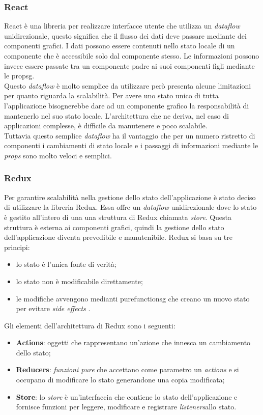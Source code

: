 \subsubsection*{React}
React è una libreria per realizzare interfacce utente che utilizza un \emph{dataflow} unidirezionale, questo significa che il flusso dei dati deve passare mediante dei componenti grafici. I dati possono essere contenuti nello stato locale di un componente che è accessibile solo dal componente stesso. Le informazioni possono invece essere passate tra un componente padre ai suoi componenti figli mediante le \gls{propsg}. \\
Questo \emph{dataflow} è molto semplice da utilizzare però presenta alcune limitazioni per quanto riguarda la scalabilità. Per avere uno stato unico di tutta l'applicazione bisognerebbe dare ad un componente grafico la responsabilità di mantenerlo nel suo stato locale. L'architettura che ne deriva, nel caso di applicazioni complesse, è difficile da manutenere e poco scalabile. \\
Tuttavia questo semplice \emph{dataflow} ha il vantaggio che per un numero ristretto di componenti i cambiamenti di stato locale e i passaggi di informazioni mediante le \emph{props} sono molto veloci e semplici.

\subsubsection*{Redux}
Per garantire scalabilità nella gestione dello stato dell'applicazione è stato deciso di utilizzare la libreria Redux. Essa offre un \emph{dataflow} unidirezionale dove lo stato è gestito all'intero di una una struttura di Redux chiamata \emph{store}. Questa struttura è esterna ai componenti grafici, quindi la gestione dello stato dell'applicazione diventa prevedibile e manutenibile. Redux si basa su tre principi:
\begin{itemize}
	\item lo stato è l'unica fonte di verità;
	\item lo stato non è modificabile direttamente;
	\item le modifiche avvengono medianti \gls{purefunctionsg} che creano un nuovo stato per evitare \emph{side effects} .
\end{itemize}

\noindent
Gli elementi dell'architettura di Redux sono i seguenti:
\begin{itemize}
	\item \textbf{Actions}: oggetti che rappresentano un'azione che innesca un cambiamento dello stato;
	\item \textbf{Reducers}: \emph{funzioni pure} che accettano come parametro un \emph{actions} e si occupano di modificare lo stato generandone una copia modificata;
	\item \textbf{Store}: lo \emph{store} è un'interfaccia che contiene lo stato dell'applicazione e fornisce funzioni per leggere, modificare e registrare \emph{listeners}\glosp allo stato.
\end{itemize}

